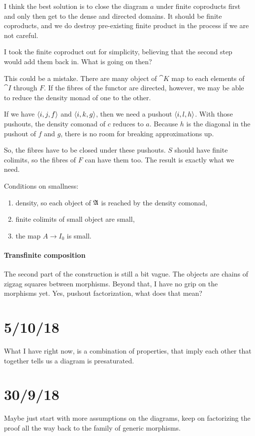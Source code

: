 \documentclass[csh.tex]{subfiles}
\begin{document}
I think the best solution is to close the diagram $a$ under finite coproducts first and only then get to the dense and directed domains. It should be finite coproducts, and we do destroy pre-existing finite product in the process if we are not careful.

I took the finite coproduct out for simplicity, believing that the second step would add them back in. What is going on then?

This could be a mistake. There are many object of $\cat K$ map to each elements of $\cat I$ through $F$. If the fibres of the functor are directed, however, we may be able to reduce the density monad of one to the other.

If we have $\left\langle i,j,f \right\rangle$ and $\left\langle i,k,g \right\rangle$, then we need a pushout $\left\langle i,l,h \right\rangle$. With those pushouts, the density comonad of $c$ reduces to $a$. Because $h$ is the diagonal in the pushout of $f$
and $g$, there is no room for breaking approximations up.

So, the fibres have to be closed under these pushouts. $S$ should have finite colimits, so the fibres of $F$ can have them too. The result is
exactly what we need.

Conditions on smallness:
\begin{enumerate}
\item density, so each object of $\mathfrak A$ is reached by the density comonad,
\item finite colimits of small object are small,
\item the map $A\to I_0$ is small.
\end{enumerate}

\paragraph{Transfinite composition}
The second part of the construction is still a bit vague. The objects are chains of zigzag squares between morphisms. Beyond that, I have no grip on the morphisms yet. Yes, pushout factorization, what does that mean?






\section{5/10/18}
What I have right now, is a combination of properties, that imply each other that together tells us a diagram is presaturated.

\section{30/9/18}
Maybe just start with more assumptions on the diagrams, keep on factorizing the proof all the way back to the family of generic morphisms.
\end{document}
